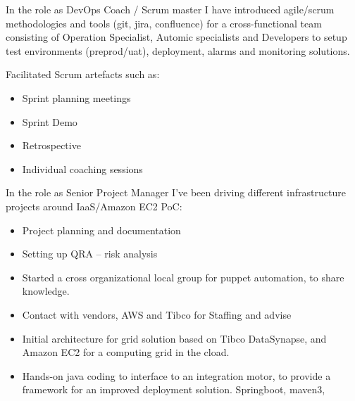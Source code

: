 \documentclass[11pt,a4paper,sans]{moderncv}
\begin{document}
In the role as DevOps Coach / Scrum master I have introduced agile/scrum methodologies and tools (git, jira, confluence) for a cross-functional team consisting of Operation Specialist, Automic specialists and Developers to setup test environments (preprod/uat), deployment, alarms and monitoring solutions. 

Facilitated Scrum artefacts such as: 
\begin{itemize}
    \item Sprint planning meetings 
    \item Sprint Demo 
    \item Retrospective 
    \item Individual coaching sessions 
\end{itemize}

In the role as Senior Project Manager I’ve been driving different infrastructure projects around IaaS/Amazon EC2 PoC: 
\begin{itemize}
    \item Project planning and documentation 
    \item Setting up QRA – risk analysis  
    \item Started a cross organizational local group for puppet automation, to share knowledge.
    \item Contact with vendors, AWS and Tibco for Staffing and advise 
    \item Initial architecture for grid solution based on Tibco DataSynapse, and Amazon EC2 for a computing grid in the cload. 
    \item Hands-on java coding to interface to an integration motor, to provide a framework for an improved deployment solution. Springboot, maven3,  
\end{itemize}
\end{document}
